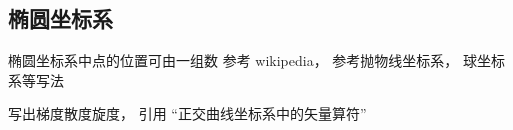 \begin{issues}
\issueDraft
\end{issues}
\subsection{椭圆坐标系}
椭圆坐标系中点的位置可由一组数
参考 wikipedia， 参考抛物线坐标系， 球坐标系等写法

写出梯度散度旋度， 引用 “正交曲线坐标系中的矢量算符”
